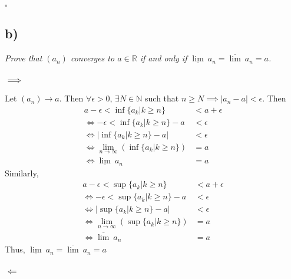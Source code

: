 \documentclass[12pt]{article}
\begin{document}
\hfill $\square$

\subsection*{ b)}
{\it Prove that $(a_n)$ converges to $a \in \mathbb{R}$ if and only if $\underline{\lim}\ a_n = \overline{\lim}\ a_n = a$.}

\subsubsection*{$\implies$}

Let $(a_n) \rightarrow a$.  Then $\forall\epsilon > 0$, $\exists N \in\mathbb{N}$ such that $n \geq N \implies |a_n - a| < \epsilon$.  Then
\begin{align*}
	a - \epsilon < \inf\{a_k | k \geq n\} &< a + \epsilon \\
	\iff -\epsilon < \inf\{a_k | k \geq n\} - a &< \epsilon \\
	\iff |\inf\{a_k | k \geq n\} - a| &< \epsilon \\
	\iff \lim_{n\rightarrow\infty}\left(\inf\{a_k | k \geq n\}\right) &= a \\
	\iff \underline{\lim}\ a_n &= a
\end{align*}
Similarly,
\begin{align*}
	a - \epsilon < \sup\{a_k | k \geq n\} &< a + \epsilon \\
	\iff -\epsilon < \sup\{a_k | k \geq n\} - a &< \epsilon \\
	\iff |\sup\{a_k | k \geq n\} - a| &< \epsilon \\
	\iff \lim_{n\rightarrow\infty}\left(\sup\{a_k | k \geq n\}\right) &= a \\
	\iff \overline{\lim}\ a_n &= a
\end{align*}
Thus, $\underline{\lim}\ a_n = \overline{\lim}\ a_n = a$

\subsubsection*{$\Longleftarrow$}
\end{document}
